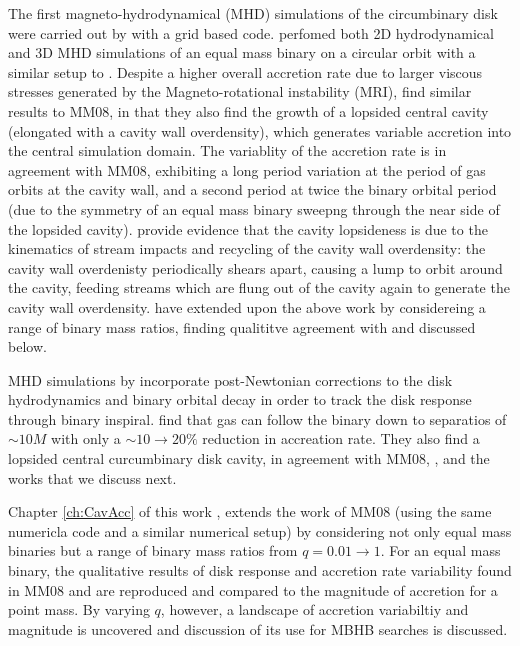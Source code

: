 The first magneto-hydrodynamical (MHD) simulations of the circumbinary disk
were carried out by \cite{ShiKrolik:2012} with a grid based code.
\cite{ShiKrolik:2012}  perfomed both 2D hydrodynamical and 3D MHD simulations
of an equal mass binary on a circular orbit with a similar setup to
\citep{MacFadyen:2008}. Despite a higher overall accretion rate due to larger
viscous stresses generated by the Magneto-rotational instability (MRI),
\cite{ShiKrolik:2012} find similar results to MM08, in that they also find the
growth of a lopsided central cavity (elongated with a cavity wall
overdensity), which generates variable accretion into the central simulation
domain. The variablity of the accretion rate is in agreement with MM08,
exhibiting a long period variation at the period of gas orbits at the cavity
wall, and a second period at twice the binary orbital period (due to the
symmetry of an equal mass binary sweepng through the near side of the lopsided
cavity). \cite{ShiKrolik:2012} provide evidence that the cavity lopsideness is
due to the kinematics of stream impacts and recycling of the cavity wall
overdensity: the cavity wall overdenisty periodically shears apart, causing a
lump to orbit around the cavity, feeding streams which are flung out of the
cavity again to generate the cavity wall overdensity. \cite{ShiKrolik:2015}
have extended upon the above work by considereing a range of binary mass ratios,
finding qualititve agreement with \cite{DHM:2013:MNRAS} and \cite{Farris:2014}
discussed below.

MHD simulations by \citep{Noble+2012} incorporate post-Newtonian corrections
to the disk hydrodynamics and binary orbital decay in order to track the disk
response through binary inspiral. \citep{Noble+2012} find that gas can follow
the binary down to separatios of $\sim10M$ with only a $\sim10 \rightarrow 20\%$
reduction in accreation rate. They also find a lopsided central curcumbinary
disk cavity, in agreement with MM08, \citep{ShiKrolik:2012}, and the works
that we discuss next.

Chapter \ref{ch:CavAcc} of this work \citep{DHM:2013:MNRAS}, extends the work
of MM08 (using the same numericla code and a similar numerical setup) by
considering not only equal mass binaries but a range of binary mass ratios
from $q=0.01 \rightarrow 1$. For an equal mass binary, the qualitative results
of disk response and accretion rate variability found in MM08 and
\citep{ShiKrolik:2012} are reproduced and compared to the magnitude of
accretion for a point mass. By varying $q$, however, a landscape of accretion
variabiltiy and magnitude is uncovered and discussion of its use for MBHB
searches is discussed.


